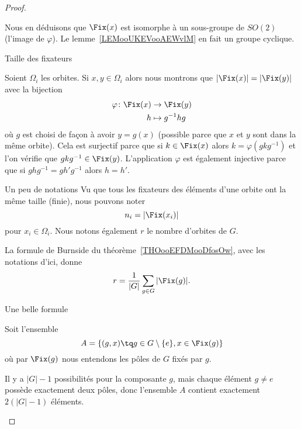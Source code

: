 \begin{proof}
\begin{subproof}
            Nous en déduisons que \( \Fix(x)\) est isomorphe à un sous-groupe de \( SO(2)\) (l'image de \( \varphi\)). Le lemme~\ref{LEMooUKEVooAEWvlM} en fait un groupe cyclique.
        \item[Taille des fixateurs]

            Soient \( \Omega_i\) les orbites. Si \( x,y\in \Omega_i\) alors nous montrons que \( | \Fix(x) |=| \Fix(y) |\) avec la bijection
            \begin{equation}
                \begin{aligned}
                    \varphi\colon \Fix(x)&\to \Fix(y) \\
                    h&\mapsto g^{-1} hg
                \end{aligned}
            \end{equation}
            où \( g\) est choisi de façon à avoir \( y=g(x)\) (possible parce que \( x\) et \( y\) sont dans la même orbite). Cela est surjectif parce que si \( k\in\Fix(x)\) alors \( k=\varphi(gkg^{-1})\) et l'on vérifie que \( gkg^{-1}\in\Fix(y)\). L'application \( \varphi\) est également injective parce que si \( ghg^{-1}=gh'g^{-1}\) alors \( h=h'\).

        \item[Un peu de notations]
            Vu que tous les fixateurs des éléments d'une orbite ont la même taille (finie), nous pouvons noter
            \begin{equation}
                n_i=| \Fix(x_i) |
            \end{equation}
            pour \( x_i\in \Omega_i\). Nous notons également \( r\) le nombre d'orbites de \( G\).

            La formule de Burnside du théorème~\ref{THOooEFDMooDfosOw}, avec les notations d'ici, donne
            \begin{equation}
                r=\frac{1}{ | G | }\sum_{g\in G}| \Fix(g) |.
            \end{equation}

        \item[Une belle formule]

            Soit l'ensemble
            \begin{equation}
                A=\{ (g,x)\tq g\in G\setminus\{ e \}, x\in \Fix(g) \}
            \end{equation}
            où par \( \Fix(g)\) nous entendons les pôles de \( G\) fixés par \( g\).

            Il y a \( | G |-1\) possibilités pour la composante \( g\), mais chaque élément \( g\neq e\) possède exactement deux pôles, donc l'ensemble \( A\) contient exactement \( 2(| G |-1)\) éléments.


\end{subproof}
\end{proof}
